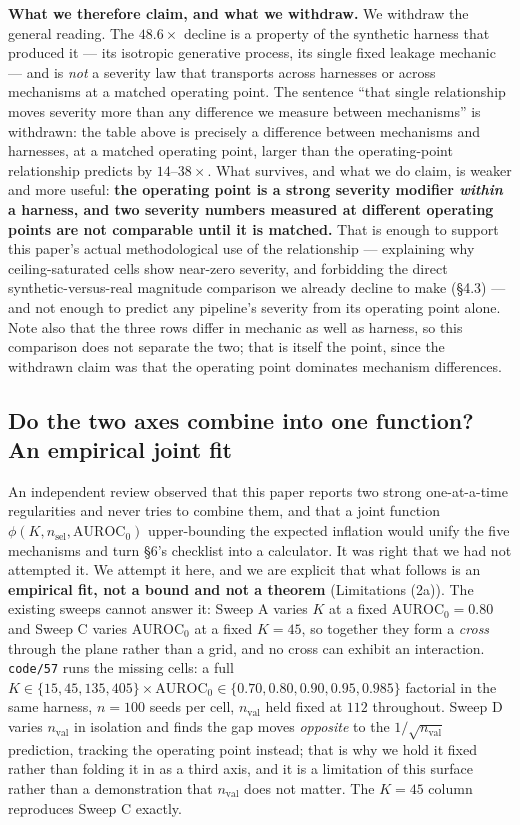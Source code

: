 \documentclass[10pt]{article} %
\begin{document}
\textbf{What we therefore claim, and what we withdraw.} We withdraw the
general reading. The $48.6\times$ decline is a property of the synthetic
harness that produced it --- its isotropic generative process, its single
fixed leakage mechanic --- and is \emph{not} a severity law that transports
across harnesses or across mechanisms at a matched operating point. The
sentence ``that single relationship moves severity more than any difference we
measure between mechanisms'' is withdrawn: the table above is precisely a
difference between mechanisms and harnesses, at a matched operating point,
larger than the operating-point relationship predicts by $14$--$38\times$.
What survives, and what we do claim, is weaker and more useful: \textbf{the
operating point is a strong severity modifier \emph{within} a harness, and two
severity numbers measured at different operating points are not comparable
until it is matched.} That is enough to support this paper's actual
methodological use of the relationship --- explaining why ceiling-saturated
cells show near-zero severity, and forbidding the direct
synthetic-versus-real magnitude comparison we already decline to make (§4.3)
--- and not enough to predict any pipeline's severity from its operating point
alone. Note also that the three rows differ in mechanic as well as harness, so
this comparison does not separate the two; that is itself the point, since the
withdrawn claim was that the operating point dominates mechanism differences.

\subsection{Do the two axes combine into one function? An empirical joint fit}

An independent review observed that this paper reports two strong
one-at-a-time regularities and never tries to combine them, and that a joint
function $\phi(K, n_{\text{sel}}, \text{AUROC}_0)$ upper-bounding the expected
inflation would unify the five mechanisms and turn §6's checklist into a
calculator. It was right that we had not attempted it. We attempt it here, and
we are explicit that what follows is an \textbf{empirical fit, not a bound and
not a theorem} (Limitations (2a)). The existing sweeps cannot answer it: Sweep
A varies $K$ at a fixed $\text{AUROC}_0=0.80$ and Sweep C varies
$\text{AUROC}_0$ at a fixed $K=45$, so together they form a \emph{cross}
through the plane rather than a grid, and no cross can exhibit an interaction.
\texttt{code/57} runs the missing cells: a full
$K\in\{15,45,135,405\}\times\text{AUROC}_0\in\{0.70,0.80,0.90,0.95,0.985\}$
factorial in the same harness, $n=100$ seeds per cell, $n_{\text{val}}$ held
fixed at $112$ throughout. Sweep D varies $n_{\text{val}}$ in isolation and
finds the gap moves \emph{opposite} to the $1/\sqrt{n_{\text{val}}}$
prediction, tracking the operating point instead; that is why we hold it fixed
rather than folding it in as a third axis, and it is a limitation of this
surface rather than a demonstration that $n_{\text{val}}$ does not matter. The $K=45$ column reproduces Sweep C exactly.
\end{document}
